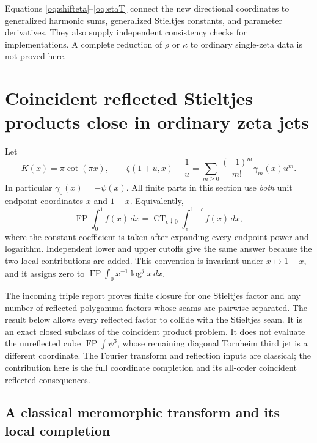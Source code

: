 \documentclass[11pt,a4paper]{article}
\numberwithin{equation}{section}
\theoremstyle{definition}
\theoremstyle{remark}
\begin{document}
Equations \eqref{oq:shifteta}--\eqref{oq:etaT} connect the new directional
coordinates to generalized harmonic sums, generalized Stieltjes constants,
and parameter derivatives. They also supply independent consistency checks
for implementations. A complete reduction of $\rho$ or $\kappa$ to ordinary
single-zeta data is not proved here.



\section{Coincident reflected Stieltjes products close in ordinary zeta jets}
\label{ct:section}

Let
\[
 K(x)=\pi\cot(\pi x),\qquad
 \zeta(1+u,x)-\frac1u
   =\sum_{m\ge0}\frac{(-1)^m}{m!}\gamma_m(x)u^m.
\]
In particular $\gamma_0(x)=-\psi(x)$. All finite parts in this section use
\emph{both} unit endpoint coordinates $x$ and $1-x$. Equivalently,
\[
 \operatorname{FP}\int_0^1 f(x)\,dx
 =\operatorname{CT}_{\epsilon\downarrow0}
       \int_\epsilon^{1-\epsilon} f(x)\,dx,
\]
where the constant coefficient is taken after expanding every endpoint
power and logarithm. Independent lower and upper cutoffs give the same
answer because the two local contributions are added. This convention
is invariant under $x\mapsto1-x$, and it assigns zero to
$\operatorname{FP}\int_0^1x^{-1}\log^j x\,dx$.

The incoming triple report proves finite closure for one Stieltjes factor
\cite{RepoTriple} and any number of reflected polygamma factors whose seams are pairwise
separated. The result below allows every reflected factor to collide with
the Stieltjes seam. It is an exact closed subclass of the coincident
product problem. It does not evaluate the unreflected cube
$\operatorname{FP}\int\psi^3$, whose remaining diagonal Tornheim third
jet is a different coordinate. The Fourier transform and reflection
inputs are classical; the contribution here is the full coordinate
completion and its all-order coincident reflected consequences.

\subsection{A classical meromorphic transform and its local completion}
\end{document}
